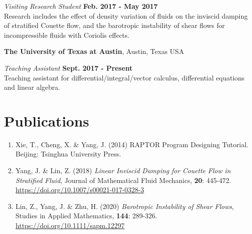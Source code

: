 \documentclass[margin,line]{res}
\begin{document}
\begin{resume}

{\em Visiting Research Student} \hfill {\bf Feb. 2017 - May 2017}\\
Research includes the effect of density variation of fluids on the inviscid damping of stratified Couette flow, and the barotropic instability of shear flows for incompressible fluids with Coriolis effects.

{\bf The University of Texas at Austin}, Austin, Texas USA

{\em Teaching Assistant} \hfill {\bf Sept. 2017 - Present}\\
Teaching assistant for differential/integral/vector calculus, differential equations and linear algebra.


\section{\sc Publications}

\begin{enumerate}[\hspace{-.13in}1.]
    \item Xie, T., Cheng, X. \& Yang, J. (2014) RAPTOR Program Designing Tutorial. Beijing: Tsinghua University Press.
    \item Yang, J. \& Lin, Z. (2018) \textit{Linear Inviscid Damping for Couette Flow in Stratified Fluid}, Journal of Mathematical Fluid Mechanics, \textbf{20}: 445-472. \href{https://doi.org/10.1007/s00021-017-0328-3}{https://doi.org/10.1007/s00021-017-0328-3}
    \item Lin, Z., Yang, J. \& Zhu, H. (2020) \textit{Barotropic Instability of Shear Flows}, Studies in Applied Mathematics, \textbf{144}: 289-326. 
    \href{https://doi.org/10.1111/sapm.12297}{https://doi.org/10.1111/sapm.12297} 
\end{enumerate}






\end{resume}
\end{document}
